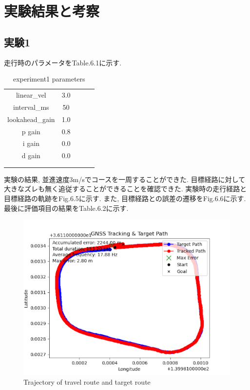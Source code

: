 \newpage

\section{実験結果と考察}

\subsection{実験1}
走行時のパラメータをTable.6.1に示す.
\begin{table}[H]
     \centering
     \caption{experiment1 parameters}
     \begin{tabular}{cclll}
     \multicolumn{1}{c|}{linear\_vel}     & 3.0  &  &  &  \\
     \multicolumn{1}{c|}{interval\_ms}    & 50   &  &  &  \\
     \multicolumn{1}{c|}{lookahead\_gain} & 1.0  &  &  &  \\
     \multicolumn{1}{c|}{p gain}          & 0.8  &  &  &  \\
     \multicolumn{1}{c|}{i gain}          & 0.0  &  &  &  \\
     \multicolumn{1}{c|}{d gain}          & 0.0 &  &  &  \\
     \multicolumn{1}{l}{}                 &      &  &  &  \\
     \multicolumn{1}{l}{}                 &      &  &  & 
     \end{tabular}
\end{table}

実験の結果, 並進速度3m/sでコースを一周することができた.
目標経路に対して大きなズレも無く追従することができることを確認できた.
実験時の走行経路と目標経路の軌跡をFig.6.5に示す.
また, 目標経路との誤差の遷移をFig.6.6に示す.
最後に評価項目の結果をTable.6.2に示す.

\begin{figure}[H]
     \centering
    \includegraphics[keepaspectratio, scale=0.7]
         {images/3mspath.png}
    \caption{Trajectory of travel route and target route}
    \label{fig:path}
\end{figure}

